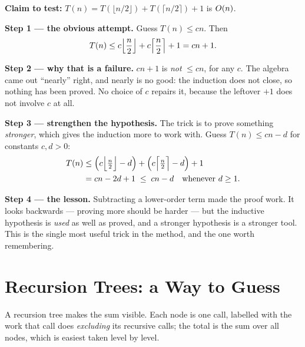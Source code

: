 \begin{worked}
\textbf{Claim to test:} $T(n) = T(\lfloor n/2 \rfloor) +
T(\lceil n/2 \rceil) + 1$ is $O(n)$.

\smallskip
\textbf{Step 1 --- the obvious attempt.} Guess $T(n) \le cn$. Then
\[ T(n) \le c\Bigl\lfloor \frac{n}{2} \Bigr\rfloor
          + c\Bigl\lceil \frac{n}{2} \Bigr\rceil + 1 = cn + 1. \]

\smallskip
\textbf{Step 2 --- why that is a failure.} $cn + 1$ is \emph{not} $\le cn$, for
any $c$. The algebra came out ``nearly'' right, and nearly is no good: the
induction does not close, so nothing has been proved. No choice of $c$ repairs
it, because the leftover $+1$ does not involve $c$ at all.

\smallskip
\textbf{Step 3 --- strengthen the hypothesis.} The trick is to prove something
\emph{stronger}, which gives the induction more to work with. Guess
$T(n) \le cn - d$ for constants $c, d > 0$:
\begin{align*}
T(n) &\le \Bigl(c\Bigl\lfloor \tfrac{n}{2} \Bigr\rfloor - d\Bigr)
        + \Bigl(c\Bigl\lceil \tfrac{n}{2} \Bigr\rceil - d\Bigr) + 1 \\
     &= cn - 2d + 1 \;\le\; cn - d \quad\text{whenever } d \ge 1.
\end{align*}

\smallskip
\textbf{Step 4 --- the lesson.} Subtracting a lower-order term made the proof
work. It looks backwards --- proving more should be harder --- but the
inductive hypothesis is \emph{used} as well as proved, and a stronger
hypothesis is a stronger tool. This is the single most useful trick in the
method, and the one worth remembering.
\end{worked}

\section{Recursion Trees: a Way to Guess}

A recursion tree makes the sum visible. Each node is one call, labelled with
the work that call does \emph{excluding} its recursive calls; the total is the
sum over all nodes, which is easiest taken level by level.

